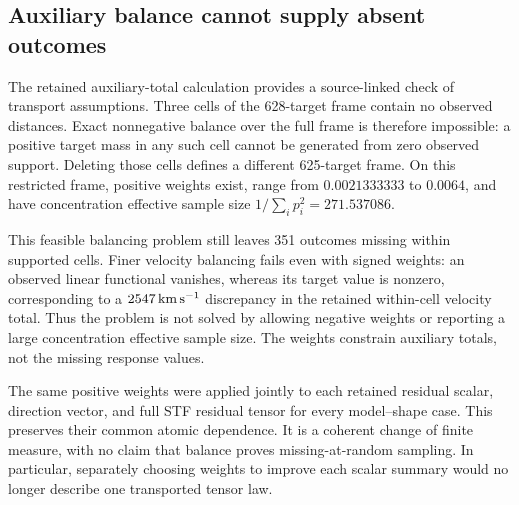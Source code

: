 \subsection{Auxiliary balance cannot supply absent outcomes}

The retained auxiliary-total calculation provides a source-linked check of transport assumptions. Three cells of the 628-target frame contain no observed distances. Exact nonnegative balance over the full frame is therefore impossible: a positive target mass in any such cell cannot be generated from zero observed support. Deleting those cells defines a different 625-target frame. On this restricted frame, positive weights exist, range from $0.0021333333$ to $0.0064$, and have concentration effective sample size $1/\sum_i p_i^2=271.537086$.

This feasible balancing problem still leaves 351 outcomes missing within supported cells. Finer velocity balancing fails even with signed weights: an observed linear functional vanishes, whereas its target value is nonzero, corresponding to a $2547\,\mathrm{km}\,\mathrm{s}^{-1}$ discrepancy in the retained within-cell velocity total. Thus the problem is not solved by allowing negative weights or reporting a large concentration effective sample size. The weights constrain auxiliary totals, not the missing response values.

The same positive weights were applied jointly to each retained residual scalar, direction vector, and full STF residual tensor for every model--shape case. This preserves their common atomic dependence. It is a coherent change of finite measure, with no claim that balance proves missing-at-random sampling. In particular, separately choosing weights to improve each scalar summary would no longer describe one transported tensor law.

